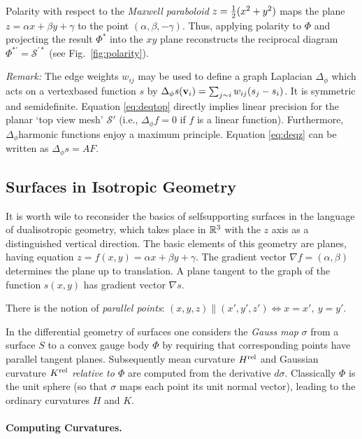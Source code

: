 \documentclass[annual]{acmsiggraph}
\def\rel{{\mathord{\text{\rm rel}}}}
\def\SS{{\mathcal S}}
\begin{document}
Polarity with respect to the {\em Maxwell paraboloid} $z={1\over 2}
(x^2+y^2)$ maps the plane $z=\alpha x + \beta y + \gamma$ to the point
$(\alpha,\beta,-\gamma)$. Thus, applying polarity to $\Phi$ and projecting
the result $\Phi^*$ into the $xy$ plane reconstructs the reciprocal
diagram $\Phi^{*\prime}=\SS^{\prime *}$ (see Fig.~\ref{fig:polarity}).

{\it Remark:} The edge weights $w_{ij}$ may be used to define a graph
Laplacian $\Delta_\phi$ which acts on a vertex\dash based function $s$ by
$\Delta_{\phi} s({\mathbf v}_i)=\sum_{j\sim i} w_{ij}(s_j-s_i)$. It is symmetric
and semidefinite. Equation \eqref{eq:deqtop} directly implies linear
precision for the planar `top view mesh' $\SS'$ (i.e., $\Delta_\phi f=0$
if $f$ is a linear function). Furthermore, $\Delta_\phi$\dash harmonic
functions enjoy a maximum principle. Equation \eqref{eq:deqz} can be
written as $\Delta_\phi s = AF$.

\subsection{Surfaces in Isotropic Geometry} \label{sec:smooth}

It is worth wile to reconsider the basics of self\dash supporting surfaces
in the language of dual\dash isotropic geometry, which takes place in
${\mathbb R}^3$ with the $z$ axis as a distinguished vertical direction. The basic
elements of this geometry are planes, having equation $z=f(x,y) = \alpha
x+\beta y+\gamma$. The gradient vector $\nabla f = (\alpha,\beta)$
determines the plane up to translation. A plane tangent to the graph of
the function $s(x,y)$ has gradient vector $\nabla s$.

There is the notion of {\em parallel points}:
	$
	(x,y,z) \parallel (x',y',z') \iff
	x=x',\ y=y'
	.$

In the differential geometry of surfaces one considers the {\em Gauss map}
$\sigma$ from a surface $S$ to a convex gauge body $\Phi$ by requiring
that corresponding points have parallel tangent planes.  Subsequently mean
curvature $H^\rel$ and Gaussian curvature $K^\rel$ {\em relative to
$\Phi$} are computed from the derivative $d\sigma$. Classically $\Phi$ is
the unit sphere (so that $\sigma$ maps each point its unit normal vector),
leading to the ordinary curvatures $H$ and $K$.


\paragraph{Computing Curvatures.}
\end{document}
